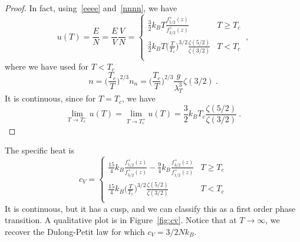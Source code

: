     \begin{proof}
        In fact, using~\eqref{eeee} and~\eqref{nnnn}, we have 
        \begin{equation*}
            u(T) = \frac{E}{N} = \frac{E}{V} \frac{V}{N} = \begin{cases}
                \frac{3}{2} k_B T \frac{f^+_{5/2} (z)}{f^+_{3/2} (z)} & T \geq T_c \\
                \frac{3}{2} k_B T \Big ( \frac{T}{T_c} \Big)^{3/2} \frac{\zeta(5/2)}{\zeta(3/2)} & T < T_c \\
            \end{cases} ~,
        \end{equation*}
        where we have used for $T < T_c$
        \begin{equation*}
            n = \Big ( \frac{T_c}{T} \Big)^{2/3} n_n = \Big ( \frac{T_c}{T} \Big)^{2/3} \frac{g}{\lambda_T^3} \zeta(3/2) ~.
        \end{equation*}
        It is continuous, since for $T = T_c$, we have
        \begin{equation*}
            \lim_{T \rightarrow T_c^-} u(T) = \lim_{T \rightarrow T_c^+} u(T) = \frac{3}{2} k_B T_c \frac{\zeta(5/2)}{\zeta(3/2)} ~.
        \end{equation*}
    \end{proof}
    The specific heat is 
    \begin{equation*}
        c_V = \begin{cases}
            \frac{15}{4} k_B \frac{f^+_{5/2} (z)}{f^+_{3/2} (z)} - \frac{9}{4} k_B \frac{f^+_{3/2} (z)}{f^+_{1/2} (z)} & T \geq T_c \\
            \frac{15}{4} k_B \Big (\frac{T}{T_c} \Big )^{3/2} \frac{\zeta (5/2)}{\zeta (3/2)} & T < T_c \\
        \end{cases}
    \end{equation*}
    It is continuous, but it has a cusp, and we can classify this as a first order phase transition. A qualitative plot is in Figure~\eqref{fig:cv}. Notice that at $T \rightarrow \infty$, we recover the Dulong-Petit law for which $c_V = 3/2 N k_B$.
